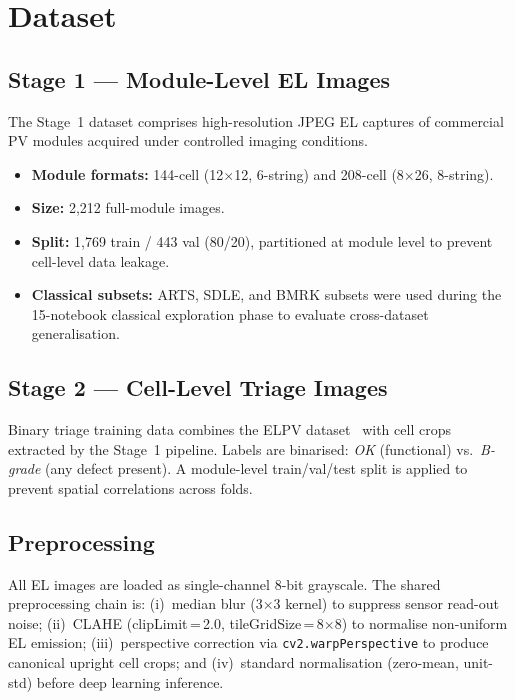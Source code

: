 \documentclass[conference]{IEEEtran}
\begin{document}
\section{Dataset}

\subsection{Stage 1 --- Module-Level EL Images}

The Stage~1 dataset comprises high-resolution JPEG EL
captures of commercial PV modules acquired under controlled
imaging conditions.
\begin{itemize}
  \item \textbf{Module formats:} 144-cell (12$\times$12,
        6-string) and 208-cell (8$\times$26, 8-string).
  \item \textbf{Size:} 2{,}212 full-module images.
  \item \textbf{Split:} 1{,}769 train / 443 val (80/20),
        partitioned at module level to prevent cell-level
        data leakage.
  \item \textbf{Classical subsets:} ARTS, SDLE, and BMRK
        subsets were used during the 15-notebook classical
        exploration phase to evaluate cross-dataset generalisation.
\end{itemize}

\subsection{Stage 2 --- Cell-Level Triage Images}

Binary triage training data combines the ELPV
dataset~\cite{deitsch2019} with cell crops extracted by
the Stage~1 pipeline.
Labels are binarised: \textit{OK} (functional) vs.\
\textit{B-grade} (any defect present).
A module-level train/val/test split is applied to prevent
spatial correlations across folds.

\subsection{Preprocessing}
All EL images are loaded as single-channel 8-bit grayscale.
The shared preprocessing chain is:
(i)~median blur (3$\times$3 kernel) to suppress sensor
read-out noise;
(ii)~CLAHE (clipLimit\,=\,2.0, tileGridSize\,=\,8$\times$8)
to normalise non-uniform EL emission;
(iii)~perspective correction via
\texttt{cv2.warpPerspective} to produce canonical upright
cell crops; and
(iv)~standard normalisation (zero-mean, unit-std) before
deep learning inference.
\end{document}

